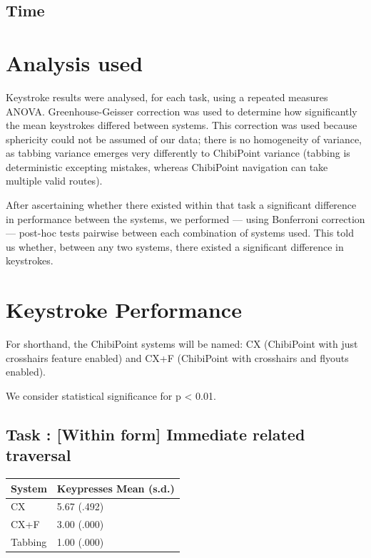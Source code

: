 \documentclass[a4paper, 12pt]{report}
\begin{document}
\subsection{Time}
\section{Analysis used}
Keystroke results were analysed, for each task, using a repeated measures ANOVA. Greenhouse-Geisser correction was used to determine how significantly the mean keystrokes differed between systems. This correction was used because sphericity could not be assumed of our data; there is no homogeneity of variance, as tabbing variance emerges very differently to ChibiPoint variance (tabbing is deterministic excepting mistakes, whereas ChibiPoint navigation can take multiple valid routes).

After ascertaining whether there existed within that task a significant difference in performance between the systems, we performed --- using Bonferroni correction --- post-hoc tests pairwise between each combination of systems used. This told us whether, between any two systems, there existed a significant difference in keystrokes.
\section{Keystroke Performance}
\newcommand{\navtask}[1]{\stepcounter{TaskType} \subsection{Task \arabic{TaskType}: #1}}
For shorthand, the ChibiPoint systems will be named: CX (ChibiPoint with just crosshairs feature enabled) and CX+F (ChibiPoint with crosshairs and flyouts enabled).

We consider statistical significance for p < 0.01.

\navtask{[Within form] Immediate related traversal}
\begin{tabular}{l l}
\hline\hline %
System & Keypresses Mean (s.d.) \\ [0.5ex] %
\hline %
CX & 5.67 (.492)\\
CX+F & 3.00 (.000)\\
Tabbing & 1.00 (.000)\\ [1ex] %
\hline %
\end{tabular}
\end{document}
